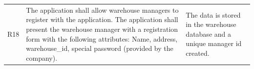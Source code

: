 \documentclass[12pt]{article}
\begin{document}
\begin{myspace}{1.7}
\begin{table}[]
\begin{tabular}{| p{.5cm}|p{9cm} |p{5cm}|}
R18 & The application shall allow warehouse managers to register with the application. The application shall present the warehouse manager with a registration form with the following attributes: Name, address, warehouse\_id, special password (provided by the company).                                 & The data is stored in the warehouse database and a unique manager id created.                                                                                                                                                                                                \\
\end{tabular}
\end{table}

%
%


\end{myspace}
\end{document}
